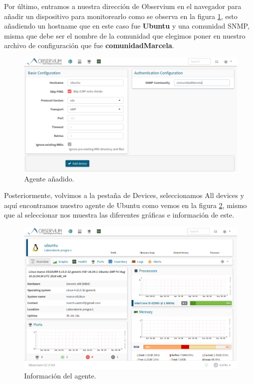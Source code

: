 Por último, entramos a nuestra dirección de Observium en el navegador para añadir un dispositivo para monitorearlo como se observa en la figura \ref{image:device}, esto añadiendo un hostname que en este caso fue \textbf{Ubuntu} y una comunidad SNMP, misma que debe ser el nombre de la comunidad que elegimos poner en nuestro archivo de configuración que fue \textbf{comunidadMarcela}.
\FloatBarrier
\begin{figure}[htbp!]
		\centering
			\includegraphics[width=.9 \textwidth]{images/device}
		\caption{Agente añadido.}
		\label{image:device}
\end{figure}
\FloatBarrier

Posteriormente, volvimos a la pestaña de Devices, seleccionamos All devices y aquí encontramos nuestro agente de Ubuntu como vemos en la figura \ref{image:deviceinfo}, mismo que al seleccionar nos muestra las diferentes gráficas e información de este.
\FloatBarrier
\begin{figure}[htbp!]
		\centering
			\includegraphics[width=.9 \textwidth]{images/deviceinfo}
		\caption{Información del agente.}
		\label{image:deviceinfo}
\end{figure}
\FloatBarrier